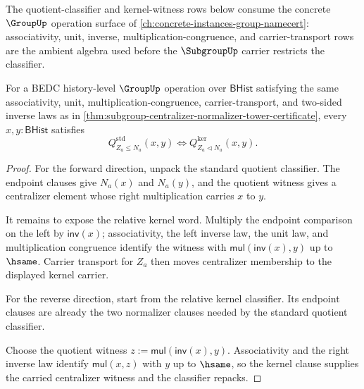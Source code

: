 The quotient-classifier and kernel-witness rows below consume the concrete $\GroupUp$ operation surface of \autoref{ch:concrete-instances-group-namecert}: associativity, unit, inverse, multiplication-congruence, and carrier-transport rows are the ambient algebra used before the $\SubgroupUp$ carrier restricts the classifier.

\begin{theorem}
\label{thm:subgroup-centralizer-quotient-classifier-kernel-iff}
For a BEDC history-level $\GroupUp$ operation over $\mathsf{BHist}$
satisfying the same associativity, unit, multiplication-congruence,
carrier-transport, and two-sided inverse laws as in
\autoref{thm:subgroup-centralizer-normalizer-tower-certificate}, every
$x,y:\mathsf{BHist}$ satisfies
$$
Q^{\mathrm{std}}_{Z_a\leq N_a}(x,y)\Longleftrightarrow
Q^{\mathrm{ker}}_{Z_a\triangleleft N_a}(x,y).
$$
\end{theorem}
\begin{proof}
For the forward direction, unpack the standard quotient classifier. The
endpoint clauses give $N_a(x)$ and $N_a(y)$, and the quotient witness gives a
centralizer element whose right multiplication carries $x$ to $y$.

It remains to expose the relative kernel word. Multiply the endpoint
comparison on the left by $\mathsf{inv}(x)$; associativity, the left inverse
law, the unit law, and multiplication congruence identify the witness with
$\mathsf{mul}(\mathsf{inv}(x),y)$ up to $\hsame$. Carrier transport for $Z_a$
then moves centralizer membership to the displayed kernel carrier.

For the reverse direction, start from the relative kernel classifier. Its
endpoint clauses are already the two normalizer clauses needed by the standard
quotient classifier.

Choose the quotient witness $z:=\mathsf{mul}(\mathsf{inv}(x),y)$. Associativity
and the right inverse law identify $\mathsf{mul}(x,z)$ with $y$ up to
$\hsame$, so the kernel clause supplies the carried centralizer witness and
the classifier repacks.
\end{proof}


